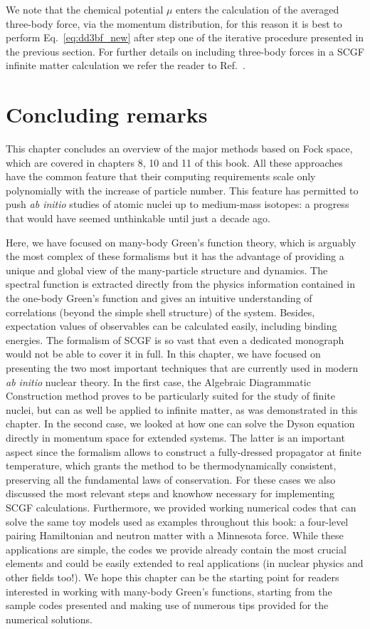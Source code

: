 We note that the chemical potential $\mu$ enters the calculation of the averaged three-body force, via the momentum distribution, for this reason it is best to perform Eq.~\eqref{eq:dd3bf_new} after step one of the iterative procedure presented in the previous section. For further details on including three-body forces in a SCGF infinite matter calculation we refer the reader to Ref.~\cite{ch11_Carbone2014PhD}.


\section{Concluding remarks}
This chapter concludes an overview of the major methods based on Fock space, which are covered in chapters 8, 10 and 11 of this book. All these approaches have the common feature that their computing requirements scale only polynomially with the increase of particle number. This feature has permitted to push {\em ab initio} studies of atomic nuclei up to medium-mass isotopes: a progress that would have seemed unthinkable until just a decade ago. 
%

Here, we have focused on many-body Green's function theory, which is arguably the most complex of these formalisms but it has the advantage of providing a unique and global view of the many-particle structure and dynamics.   The spectral function is extracted directly from the physics information contained in the one-body Green's function and gives an intuitive understanding of correlations (beyond the simple shell structure) of the system. Besides, expectation values of observables can be calculated easily, including binding energies.
%
The formalism of SCGF is so vast that even a dedicated monograph would not be able to cover it in full. In this chapter, we have focused on presenting the two most important techniques that are currently used in modern {\em ab initio} nuclear theory.
 In the first case, the Algebraic Diagrammatic Construction method proves to be particularly suited for the study of finite nuclei, but can as well be applied to infinite matter, as was demonstrated in this chapter. In the second case, we looked at how one can solve the  Dyson equation directly in momentum space for extended systems.  The latter is an important aspect since the formalism allows to construct a fully-dressed propagator at finite temperature, which grants the method to be thermodynamically consistent, preserving all the fundamental laws of conservation. 
%
%
For these cases we also discussed the most relevant steps and knowhow necessary for implementing SCGF calculations. Furthermore, we provided working numerical codes that can solve the same toy models used as examples throughout this book: a four-level pairing Hamiltonian and neutron matter with a Minnesota force.   While these applications are simple, the codes we provide already contain the most crucial elements and could be easily extended to real applications (in nuclear physics and other fields too!). We hope this chapter can be the starting point for readers interested in working with many-body Green's functions, starting from the sample codes presented and making use of numerous tips provided for the numerical solutions.


